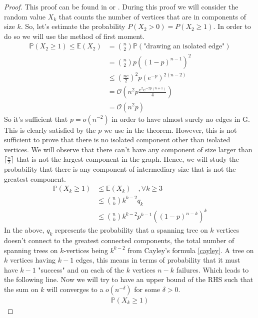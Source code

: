 \begin{proof}
This proof can be found in \cite{Spencer14} or \cite{Bollob01}.
\newline
During this proof we will consider the random value $X_k$ that counts the number of vertices that are in components of size $k$.
So, let's estimate the probability $P(X_2 > 0) = P(X_2 \geq 1 )$. In order to do so we will use the method of first moment.
\begin{align}
	\mathbb{P}(X_2 \geq 1) \leq \mathbb{E}(X_2) 	&= \binom{n}{2}\mathbb{P}(\text{"drawing an isolated edge"}) \\
						    	&= \binom{n}{2}p((1-p)^{n-1})^2 \\
							&\leq (\frac{ne}{2})^2p(e^{-p})^{2(n-2)} \\
						    	&= \mathcal{O}\left(n^2p \frac{ e^2 e^{-2p(n+1)} }{4}\right) \\
							&= \mathcal{O}(n^2p)
\end{align}
So it's sufficient that $p = o(n^{-2})$ in order to have almost surely no edges in G. This is clearly satisfied by the $p$ we use in the theorem.
\newline
However, this is not sufficient to prove that there is no isolated component other than isolated vertices. We will observe that there can't have any component of size larger than $\lceil \frac{n}{2} \rceil$ that is not the largest component in the graph.
Hence, we will study the probability that there is any component of intermediary size that is not the greatest component.
\begin{align}
	\mathbb{P}(X_k \geq 1) &\leq \mathbb{E}(X_k)\quad, \forall k \geq 3 \\
				&\leq \binom{n}{k} k^{k-2} q_k\\
				&\leq \binom{n}{k} k^{k-2} p^{k-1} ((1-p)^{n-k})^k
\end{align}
In the above, $q_k$ represents the probability that a spanning tree on $k$ vertices doesn't connect to the greatest connected components, the total number of spanning trees on $k$-vertices being $k^{k-2}$ from Cayley's formula \ref{cayley}.
A tree on $k$ vertices having $k-1$ edges, this means in terms of probability that it must have $k-1$ "success" and on each of the $k$ vertices $n-k$ failures. Which leads to the following line.
\newline 
Now we will try to have an upper bound of the RHS such that the sum on $k$ will converges to a $o(n^{-\delta})$ for some $\delta >0$.
\begin{align}
	\mathbb{P}(X_k \geq 1) 	

\end{align}
\end{proof}
